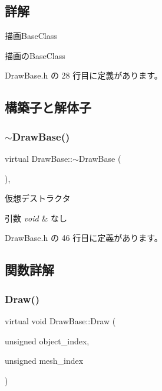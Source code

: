 \subsection{詳解}
描画\+Base\+Class 

描画の\+Base\+Class 

 Draw\+Base.\+h の 28 行目に定義があります。



\subsection{構築子と解体子}
\mbox{\label{class_draw_base_a799597f696c5cbf6074fb2655dea5e18}} 
\subsubsection{\texorpdfstring{$\sim$\+Draw\+Base()}{~DrawBase()}}
{\footnotesize\ttfamily virtual Draw\+Base\+::$\sim$\+Draw\+Base (\begin{DoxyParamCaption}{ }\end{DoxyParamCaption})\hspace{0.3cm}{\ttfamily [inline]}, {\ttfamily [virtual]}}



仮想デストラクタ 


\begin{DoxyParams}{引数}
{\em void} & なし \\
\hline
\end{DoxyParams}


 Draw\+Base.\+h の 46 行目に定義があります。



\subsection{関数詳解}
\mbox{\label{class_draw_base_a408080106630a1146d7af0bb46a4d8d1}} 
\subsubsection{\texorpdfstring{Draw()}{Draw()}}
{\footnotesize\ttfamily virtual void Draw\+Base\+::\+Draw (\begin{DoxyParamCaption}\item[{unsigned}]{object\+\_\+index,  }\item[{unsigned}]{mesh\+\_\+index }\end{DoxyParamCaption})\hspace{0.3cm}{\ttfamily [pure virtual]}}



